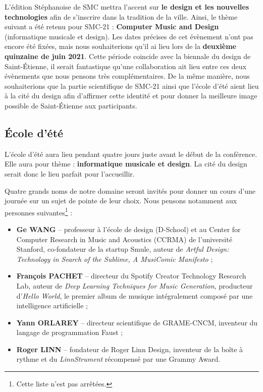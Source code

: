 \documentclass[fontsize=12pt]{scrartcl} %
\numberwithin{equation}{section} %
\numberwithin{figure}{section} %
\numberwithin{table}{section} %
\begin{document}
L'édition Stéphanoise de SMC mettra l'accent sur \textbf{le design et les nouvelles technologies} afin de s'inscrire dans la tradition de la ville. Ainsi, le thème suivant a été retenu pour SMC-21 : \textbf{Computer Music and Design} (informatique musicale et design). Les dates précises de cet évènement n'ont pas encore été fixées, mais nous souhaiterions qu'il ai lieu lors de la \textbf{deuxième quinzaine de juin 2021}. Cette période coincide avec la biennale du design de Saint-Étienne, il serait fantastique qu'une collaboration ait lieu entre ces deux évènements que nous pensons très complémentaires. De la même manière, nous souhaiterions que la partie scientifique de SMC-21 ainsi que l'école d'été aient lieu à la cité du design afin d'affirmer cette identité et pour donner la meilleure image possible de Saint-Étienne aux participants. 

\subsection{École d'été}
\label{subsec:ss}

L'école d'été aura lieu pendant quatre jours juste avant le début de la conférence. Elle aura pour thème : \textbf{informatique musicale et design}. La cité du design serait donc le lieu parfait pour l'accueillir.

Quatre grands noms de notre domaine seront invités pour donner un cours d'une journée sur un sujet de pointe de leur choix. Nous pensons notamment aux personnes suivantes\footnote{Cette liste n'est pas arrêtées.} :

\begin{itemize}
  \item \textbf{Ge WANG} -- professeur à l'école de design (D-School) et au Center for Computer Research in Music and Acoustics (CCRMA) de l'université Stanford, co-fondateur de la startup Smule, auteur de \textit{Artful Design: Technology in Search of the Sublime, A MusiComic Manifesto} ;
  \item \textbf{François PACHET} -- directeur du Spotify Creator Technology Research Lab, auteur de \textit{Deep Learning Techniques for Music Generation}, producteur d'\textit{Hello World}, le premier album de musique intégralement composé par une intelligence artificielle ;
  \item \textbf{Yann ORLAREY} -- directeur scientifique de GRAME-CNCM, inventeur du langage de programmation Faust ;
  \item \textbf{Roger LINN} -- fondateur de Roger Linn Design, inventeur de la boîte à rythme et du \textit{LinnStrument} récompensé par une Grammy Award.
\end{itemize} 
\end{document}
